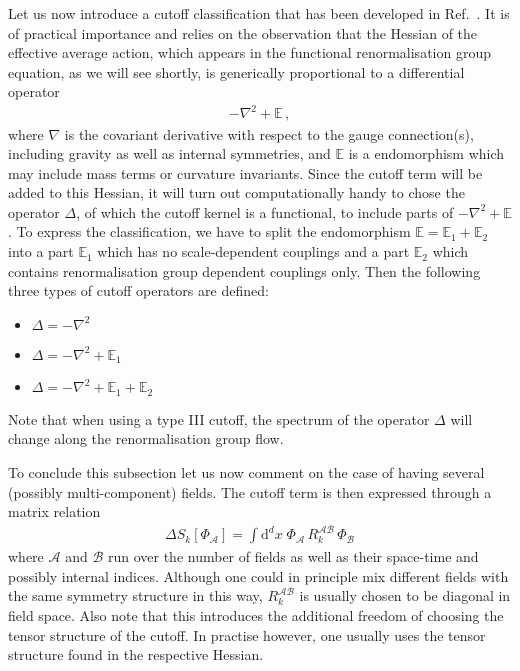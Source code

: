 \documentclass[11pt]{book}
\numberwithin{equation}{chapter}
\begin{document}
\noindent
Let us now introduce a cutoff classification that has been
developed in Ref.~\cite{Codello:2008vh}. It is of practical
importance and relies on the observation that the Hessian
of the effective average action, which appears in the
functional renormalisation group equation, as we will see
shortly, is generically proportional to a differential
operator
\begin{align}
  - \nabla^2 + \mathbb E \,,
\end{align}
where $\nabla$ is the covariant derivative with respect to
the gauge connection(s), including gravity as well as internal
symmetries, and $\mathbb E$ is a endomorphism which may include
mass terms or curvature invariants. Since the cutoff term will
be added to this Hessian, it will turn out computationally
handy to chose the operator $\Delta$,
of which the cutoff kernel is a functional,
to include parts of $- \nabla^2 + \mathbb E$.
To express the classification, we have to split
the endomorphism $\mathbb E = \mathbb E_1 + \mathbb E_2$
into a part $\mathbb E_1$ which has no scale-dependent
couplings and a part $\mathbb E_2$ which contains
renormalisation group dependent couplings only.
Then the following three types of cutoff operators
are defined:
\bigskip
\begin{itemize}
  \setlength\itemsep{2.0mm}
  \item
    {   {$\Delta = - \nabla^2$}}
  \item
    {  {$\Delta = - \nabla^2 + \mathbb E_1$}}
  \item
    { {$\Delta = - \nabla^2 + \mathbb E_1 + \mathbb E_2$}}
\end{itemize}
\bigskip
Note that when using a type III cutoff, the spectrum of the operator
$\Delta$ will change along the renormalisation group
flow.

To conclude this subsection let us now comment on the case
of having several (possibly multi-component) fields.
The cutoff term is then expressed through a matrix relation
\begin{align}
  \Delta S_k [ \Phi_{\mathcal A} ]
  = \int \mathrm d^dx \;
  \Phi_{\mathcal A} \, R^{\mathcal A \mathcal B}_k \, \Phi_{\mathcal B}
\end{align}
where $\mathcal A$ and $\mathcal B$ run over the number
of fields as well as their space-time and possibly internal
indices. Although one could in principle mix different fields
with the same symmetry structure in this way,
$R^{\mathcal A \mathcal B}_k$ is usually chosen to be diagonal
in field space. Also note that this introduces the additional
freedom of choosing the tensor structure of the cutoff.
In practise however, one usually uses the tensor structure
found in the respective Hessian.
\end{document}
